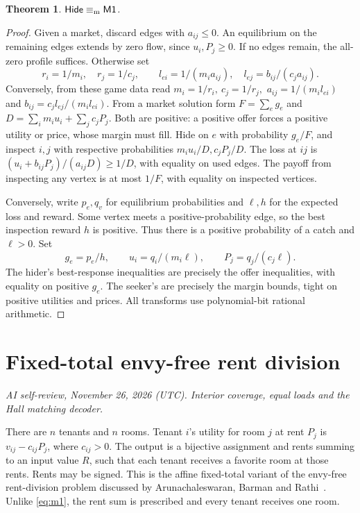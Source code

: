 \documentclass[11pt,oneside,openany,notitlepage]{report}
\newtheorem{theorem}{Theorem}[chapter]
\newcommand{\Market}{\mathsf{M1}}
\newcommand{\reviewdate}{November 26, 2026 (UTC)}
\newcommand{\reviewmark}[1]{\par\nopagebreak[4]\noindent
  {\footnotesize\itshape AI self-review, \reviewdate. #1\par}\nobreak\smallskip}
\begin{document}
\begin{theorem}\label{thm:hide}
\(\mathsf{Hide}\mathrel{\equiv_{\rm m}}\Market\).
\end{theorem}
\begin{proof}
Given a market, discard edges with \(a_{ij}\le0\). An equilibrium on the
remaining edges extends by zero flow, since \(u_i,P_j\ge0\). If no edges
remain, the all-zero profile suffices. Otherwise set
\[
  r_i=1/m_i,\quad r_j=1/c_j,\qquad
  l_{ei}=1/(m_i a_{ij}),\quad l_{ej}=b_{ij}/(c_j a_{ij}).
\]
Conversely, from these game data read \(m_i=1/r_i,\ c_j=1/r_j,\)
\(a_{ij}=1/(m_i l_{ei})\) and \(b_{ij}=c_jl_{ej}/(m_i l_{ei})\).
From a market solution form \(F=\sum_e g_e\) and
\(D=\sum_i m_i u_i+\sum_j c_jP_j\). Both are positive: a positive offer
forces a positive utility or price, whose margin must fill. Hide on \(e\)
with probability \(g_e/F\), and inspect \(i,j\) with respective
probabilities \(m_i u_i/D,c_jP_j/D\). The loss at \(ij\) is
\((u_i+b_{ij}P_j)/(a_{ij}D)\ge1/D\), with equality on used edges.
The payoff from inspecting any vertex is at most \(1/F\), with equality
on inspected vertices.

Conversely, write \(p_e,q_v\) for equilibrium probabilities and \(\ell,h\)
for the expected loss and reward. Some vertex meets a positive-probability
edge, so the best inspection reward \(h\) is positive. Thus there is a
positive probability of a catch and \(\ell>0\). Set
\[
   g_e=p_e/h,\qquad u_i=q_i/(m_i\ell),\qquad P_j=q_j/(c_j\ell).
\]
The hider's best-response inequalities are precisely the offer
inequalities, with equality on positive \(g_e\). The seeker's are precisely
the margin bounds, tight on positive utilities and prices. All transforms
use polynomial-bit rational arithmetic.
\end{proof}

\chapter{Fixed-total envy-free rent division}\label{sec:rent}
\reviewmark{Interior coverage, equal loads and the Hall matching decoder.}

There are \(n\) tenants and \(n\) rooms. Tenant \(i\)'s utility for room
\(j\) at rent \(P_j\) is \(v_{ij}-c_{ij}P_j\), where \(c_{ij}>0\).
The output is a bijective assignment and rents summing to an input value
\(R\), such that each tenant receives a favorite room at those rents.
Rents may be signed. This is the affine fixed-total variant of the
envy-free rent-division problem discussed by Arunachaleswaran, Barman and
Rathi~\cite[\S6]{abr}. Unlike \eqref{eq:m1}, the rent sum is prescribed
and every tenant receives one room.
\end{document}
